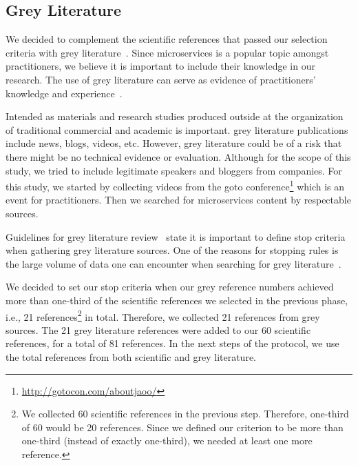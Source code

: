 \subsection{Grey Literature}

We decided to complement the scientific references that passed our selection criteria with grey literature~\cite{Garousi2016}. Since microservices is a popular topic amongst practitioners, we believe it is important to include their knowledge in our research. The use of grey literature can serve as evidence of practitioners' knowledge and experience~\cite{Kamei2019}.

Intended as materials and research studies produced outside at the organization of traditional commercial and academic is important. grey literature publications include news, blogs, videos, etc. However, grey literature could be of a risk that there might be no technical evidence or evaluation. Although for the scope of this study, we tried to include legitimate speakers and bloggers from companies.
%
For this study, we started by collecting videos from the goto conference\footnote{\url{http://gotocon.com/aboutjaoo/}} which is an event for practitioners. Then we searched for microservices content by respectable sources. 

Guidelines for grey literature review~\cite{Garousi2019} state it is important to define stop criteria when gathering grey literature sources. One of the reasons for stopping rules is the large volume of data one can encounter when searching for grey literature~\cite{Garousi2019}. 

We decided to set our stop criteria when our grey reference numbers achieved more than one-third of the scientific references we selected in the previous phase, i.e., 21 references\footnote{We collected 60 scientific references in the previous step. Therefore, one-third of 60 would be 20 references. Since we defined our criterion to be more than one-third (instead of exactly one-third), we needed at least one more reference.} in total. Therefore, we collected 21 references from grey sources.
%
The 21 grey literature references were added to our 60 scientific references, for a total of 81 references. %
In the next steps of the protocol, we use the total references from both scientific and grey literature.




